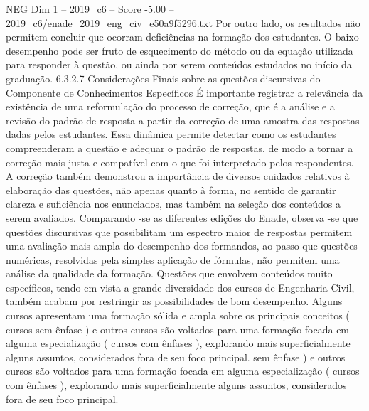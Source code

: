 \begin{textsample}{NEG Dim 1 – 2019\_c6 – Score -5.00 – 2019\_c6/enade\_2019\_eng\_civ\_e50a9f5296.txt}
Por outro lado, os resultados não permitem concluir que ocorram deficiências na formação dos estudantes.
O baixo desempenho pode ser fruto de esquecimento do método ou da equação utilizada para responder à questão, ou ainda por serem conteúdos estudados no início da graduação. 6.3.2.7 Considerações Finais sobre as questões discursivas do Componente de Conhecimentos Específicos É importante registrar a relevância da existência de uma reformulação do processo de correção, que é a análise e a revisão do padrão de resposta a partir da correção de uma amostra das respostas dadas pelos estudantes.
Essa dinâmica permite detectar como os estudantes compreenderam a questão e adequar o padrão de respostas, de modo a tornar a correção mais justa e compatível com o que foi interpretado pelos respondentes.
A correção também demonstrou a importância de diversos cuidados relativos à elaboração das questões, não apenas quanto à forma, no sentido de garantir clareza e suficiência nos enunciados, mas também na seleção dos conteúdos a serem avaliados.
Comparando -se as diferentes edições do Enade, observa -se que questões discursivas que possibilitam um espectro maior de respostas permitem uma avaliação mais ampla do desempenho dos formandos, ao passo que questões numéricas, resolvidas pela simples aplicação de fórmulas, não permitem uma análise da qualidade da formação.
Questões que envolvem conteúdos muito específicos, tendo em vista a grande diversidade dos cursos de Engenharia Civil, também acabam por restringir as possibilidades de bom desempenho.
Alguns cursos apresentam uma formação sólida e ampla sobre os principais conceitos ( cursos sem ênfase ) e outros cursos são voltados para uma formação focada em alguma especialização ( cursos com ênfases ), explorando mais superficialmente alguns assuntos, considerados fora de seu foco principal. sem ênfase ) e outros cursos são voltados para uma formação focada em alguma especialização ( cursos com ênfases ), explorando mais superficialmente alguns assuntos, considerados fora de seu foco principal.

\end{textsample}
